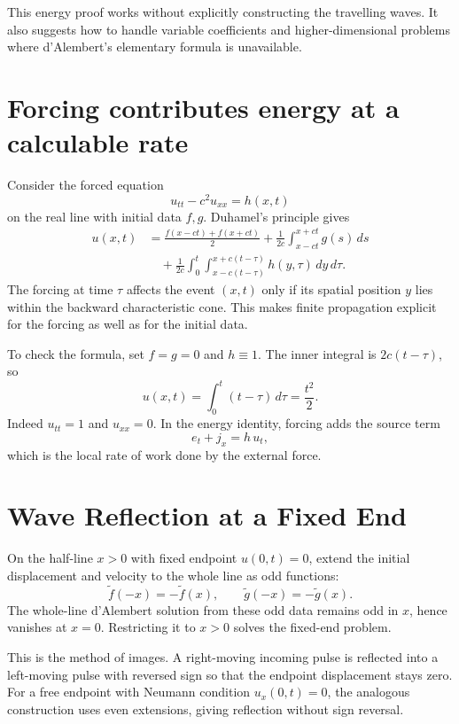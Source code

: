 This energy proof works without explicitly constructing the travelling waves. It also suggests how to handle variable coefficients and higher-dimensional problems where d'Alembert's elementary formula is unavailable.

\section{Forcing contributes energy at a calculable rate}

Consider the forced equation
\[
 u_{tt}-c^2u_{xx}=h(x,t)
\]
on the real line with initial data \(f,g\). Duhamel's principle gives
\[
 \boxed{
 \begin{aligned}
 u(x,t)&=\frac{f(x-ct)+f(x+ct)}2
       +\frac1{2c}\int_{x-ct}^{x+ct}g(s)\,ds\\
 &\quad+\frac1{2c}\int_0^t
        \int_{x-c(t-\tau)}^{x+c(t-\tau)}
             h(y,\tau)\,dy\,d\tau.
 \end{aligned}}
\]
The forcing at time \(\tau\) affects the event \((x,t)\) only if its spatial position \(y\) lies within the backward characteristic cone. This makes finite propagation explicit for the forcing as well as for the initial data.

To check the formula, set \(f=g=0\) and \(h\equiv1\). The inner integral is \(2c(t-\tau)\), so
\[
 u(x,t)=\int_0^t(t-\tau)\,d\tau=\frac{t^2}{2}.
\]
Indeed \(u_{tt}=1\) and \(u_{xx}=0\). In the energy identity, forcing adds the source term
\[
 e_t+j_x=h\,u_t,
\]
which is the local rate of work done by the external force.

\section{Wave Reflection at a Fixed End}

On the half-line \(x>0\) with fixed endpoint \(u(0,t)=0\), extend the initial displacement and velocity to the whole line as odd functions:
\[
 \widetilde f(-x)=-\widetilde f(x),\qquad
 \widetilde g(-x)=-\widetilde g(x).
\]
The whole-line d'Alembert solution from these odd data remains odd in \(x\), hence vanishes at \(x=0\). Restricting it to \(x>0\) solves the fixed-end problem.

This is the method of images. A right-moving incoming pulse is reflected into a left-moving pulse with reversed sign so that the endpoint displacement stays zero. For a free endpoint with Neumann condition \(u_x(0,t)=0\), the analogous construction uses even extensions, giving reflection without sign reversal.

